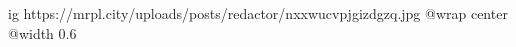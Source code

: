 
 
 
 
 

\ifcmt
  ig https://mrpl.city/uploads/posts/redactor/nxxwucvpjgizdgzq.jpg
  @wrap center
  @width 0.6
\fi
